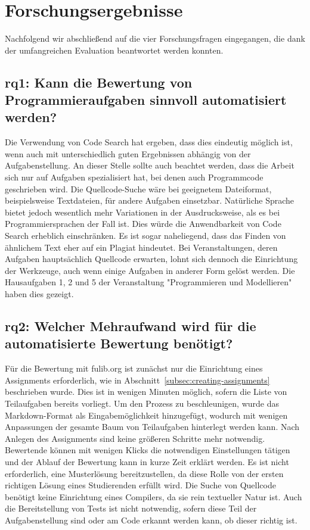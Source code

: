 \section{Forschungsergebnisse}\label{sec:research-results}

Nachfolgend wir abschließend auf die vier Forschungsfragen eingegangen, die dank der umfangreichen Evaluation beantwortet werden konnten.

\subsection[\acs{rq}1]{\ac{rq}1: Kann die Bewertung von Programmieraufgaben sinnvoll automatisiert werden?}\label{subsec:ra1-useful-automation}

Die Verwendung von Code Search hat ergeben, dass dies eindeutig möglich ist, wenn auch mit unterschiedlich guten Ergebnissen abhängig von der Aufgabenstellung.
An dieser Stelle sollte auch beachtet werden, dass die Arbeit sich nur auf Aufgaben spezialisiert hat, bei denen auch Programmcode geschrieben wird.
Die Quellcode-Suche wäre bei geeignetem Dateiformat, beispielsweise Textdateien, für andere Aufgaben einsetzbar.
Natürliche Sprache bietet jedoch wesentlich mehr Variationen in der Ausdrucksweise, als es bei Programmiersprachen der Fall ist.
Dies würde die Anwendbarkeit von Code Search erheblich einschränken.
Es ist sogar naheliegend, dass das Finden von ähnlichem Text eher auf ein Plagiat hindeutet.
Bei Veranstaltungen, deren Aufgaben hauptsächlich Quellcode erwarten, lohnt sich dennoch die Einrichtung der Werkzeuge, auch wenn einige Aufgaben in anderer Form gelöst werden.
Die Hausaufgaben 1, 2 und 5 der Veranstaltung "Programmieren und Modellieren" haben dies gezeigt.

\subsection[\acs{rq}2]{\ac{rq}2: Welcher Mehraufwand wird für die automatisierte Bewertung benötigt?}\label{subsec:ra2-additional-effort}

Für die Bewertung mit fulib.org ist zunächst nur die Einrichtung eines Assignments erforderlich, wie in Abschnitt~\ref{subsec:creating-assignments} beschrieben wurde.
Dies ist in wenigen Minuten möglich, sofern die Liste von Teilaufgaben bereits vorliegt.
Um den Prozess zu beschleunigen, wurde das Markdown-Format als Eingabemöglichkeit hinzugefügt, wodurch mit wenigen Anpassungen der gesamte Baum von Teilaufgaben hinterlegt werden kann.
Nach Anlegen des Assignments sind keine größeren Schritte mehr notwendig.
Bewertende können mit wenigen Klicks die notwendigen Einstellungen tätigen und der Ablauf der Bewertung kann in kurze Zeit erklärt werden.
Es ist nicht erforderlich, eine Musterlösung bereitzustellen, da diese Rolle von der ersten richtigen Lösung eines Studierenden erfüllt wird.
Die Suche von Quellcode benötigt keine Einrichtung eines Compilers, da sie rein textueller Natur ist.
Auch die Bereitstellung von Tests ist nicht notwendig, sofern diese Teil der Aufgabenstellung sind oder am Code erkannt werden kann, ob dieser richtig ist.

